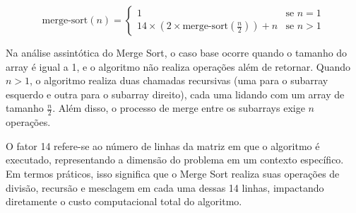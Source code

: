 \[
\text{merge-sort}(n) = 
\begin{cases} 
1 & \text{se } n = 1 \\
14 \times \left( 2 \times \text{merge-sort}\left(\frac{n}{2}\right) \right) + n & \text{se } n > 1
\end{cases}
\]

Na análise assintótica do Merge Sort, o caso base ocorre quando o tamanho do array é igual a 1, e o algoritmo não realiza operações além de retornar. Quando \( n > 1 \), o algoritmo realiza duas chamadas recursivas (uma para o subarray esquerdo e outra para o subarray direito), cada uma lidando com um array de tamanho \( \frac{n}{2} \). Além disso, o processo de merge entre os subarrays exige \( n \) operações.

O fator 14 refere-se ao número de linhas da matriz em que o algoritmo é executado, representando a dimensão do problema em um contexto específico. Em termos práticos, isso significa que o Merge Sort realiza suas operações de divisão, recursão e mesclagem em cada uma dessas 14 linhas, impactando diretamente o custo computacional total do algoritmo.